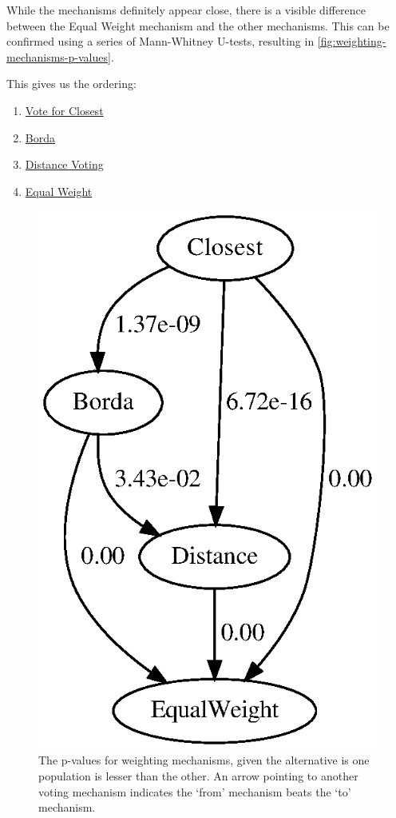While the mechanisms definitely appear close, there is a visible difference between
the Equal Weight mechanism and the other mechanisms.
This can be confirmed using a series of Mann-Whitney U-tests, resulting in
\autoref{fig:weighting-mechanisms-p-values}.
\begin{samepage}
    This gives us the ordering:
    \begin{enumerate}
        \item \hyperref[para:closest]{Vote for Closest}
        \item \hyperref[para:borda]{Borda}
        \item \hyperref[para:distance-voting]{Distance Voting}
        \item \hyperref[para:equal-weight]{Equal Weight}
    \end{enumerate}
\end{samepage}

\begin{figure}[htbp]
    \centering
    \includegraphics[scale=0.75]
    {./content/figures/weighting_mechanisms/weighting-mechanisms-p-values.gv}
    \caption{The p-values for weighting mechanisms, given the alternative is one
    population is lesser than the other.
    An arrow pointing to another voting mechanism indicates the `from' mechanism
    beats the `to' mechanism.}
    \label{fig:weighting-mechanisms-p-values}
\end{figure}


